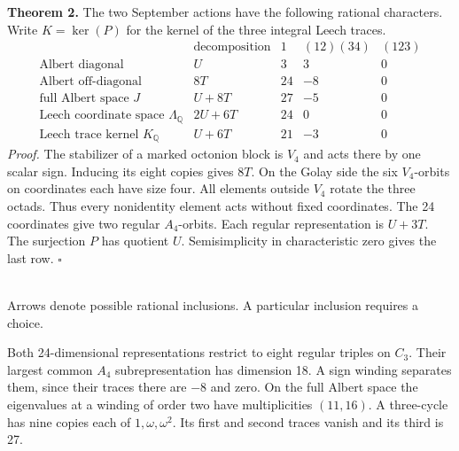 \documentclass[11pt,a4paper]{article}
\newcommand{\Q}{\mathbb Q}
\begin{document}
\textbf{Theorem 2.} The two September actions have the following rational characters. Write $K=\ker(P)$ for the
kernel of the three integral Leech traces.
\[
\begin{array}{l|c|rrr}
 & \text{decomposition}& 1 & (12)(34) & (123)\\ \hline
\text{Albert diagonal} & U          &3&3&0\\
\text{Albert off-diagonal} & 8T     &24&-8&0\\
\text{full Albert space }J & U+8T   &27&-5&0\\
\text{Leech coordinate space }\Lambda_{\Q} & 2U+6T &24&0&0\\
\text{Leech trace kernel }K_{\Q} & U+6T&21&-3&0
\end{array}
\]
\textit{Proof.} The stabilizer of a marked octonion block is $V_4$ and acts there by one scalar sign.
Inducing its eight copies gives $8T$. On the Golay side the six $V_4$-orbits on coordinates each have size four.
All elements outside $V_4$ rotate the three octads. Thus every nonidentity element acts without fixed coordinates.
The 24 coordinates give two regular $A_4$-orbits. Each regular representation is $U+3T$.
The surjection $P$ has quotient $U$. Semisimplicity in characteristic zero gives the last row.
\hfill$\square$

\begin{center}
\\[-1pt]
{\small Arrows denote possible rational inclusions. A particular inclusion requires a choice.}
\end{center}
Both 24-dimensional representations restrict to eight regular triples on $C_3$. Their largest common $A_4$
subrepresentation has dimension 18. A sign winding separates them, since their traces there are $-8$ and zero.
On the full Albert space the eigenvalues at a winding of order two have multiplicities $(11,16)$.
A three-cycle has nine copies each of $1,\omega,\omega^2$. Its first and second traces vanish and its third is 27.
\end{document}
